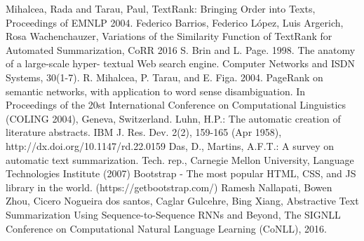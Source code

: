 \documentclass[twoside,twocolumn]{article}
\begin{document}



\begin{thebibliography}{99}

 Mihalcea, Rada  and  Tarau, Paul, TextRank: Bringing Order into Texts, Proceedings of EMNLP 2004.
 Federico Barrios, Federico L{\'{o}}pez, Luis Argerich, Rosa Wachenchauzer, Variations of the Similarity Function of TextRank for Automated Summarization, CoRR 2016
 S. Brin and L. Page. 1998. The anatomy of a large-scale hyper- textual Web search engine. Computer Networks and ISDN Systems, 30(1-7).
 R. Mihalcea, P. Tarau, and E. Figa. 2004. PageRank on semantic networks, with application to word sense disambiguation. In Proceedings of the 20st International Conference on Computational Linguistics (COLING 2004), Geneva, Switzerland.
 Luhn, H.P.: The automatic creation of literature abstracts. IBM J. Res. Dev. 2(2), 159-165 (Apr 1958), http://dx.doi.org/10.1147/rd.22.0159
 Das, D., Martins, A.F.T.: A survey on automatic text summarization. Tech. rep., Carnegie Mellon University, Language Technologies Institute (2007)
 Bootstrap - The most popular HTML, CSS, and JS library in the world. (https://getbootstrap.com/)
 Ramesh Nallapati, Bowen Zhou, Cicero Nogueira dos santos, Caglar Gulcehre, Bing Xiang, Abstractive Text Summarization Using Sequence-to-Sequence RNNs and Beyond, The SIGNLL Conference on Computational Natural Language Learning (CoNLL), 2016.

\end{thebibliography}



\end{document}
